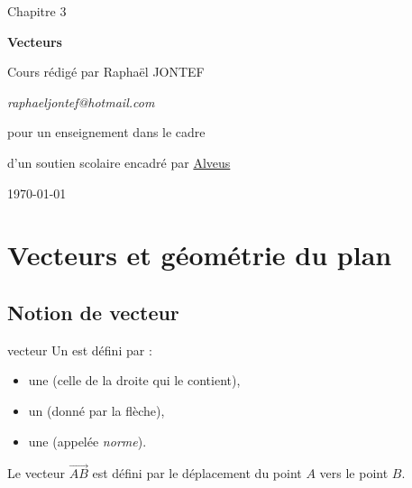 

\newcommand{\titrechapitre}{Vecteurs}
\newcommand{\numerochapitre}{3}

\renewcommand{\headrulewidth}{0.4pt}
\renewcommand{\footrulewidth}{0.4pt}
\fancyfoot[C]{\thepage}
\fancyhead[R]{\titrechapitre}




\setlength{\headheight}{15pt}
\begin{titlepage}
    \centering
    \vspace*{3cm}
    {\huge Chapitre \numerochapitre\par}
    {\Huge \bfseries\titrechapitre\par}
    \vspace{8cm}
    {\Large Cours rédigé par Raphaël JONTEF\par}
    \vspace{2em}
    {\small \textit{raphaeljontef@hotmail.com}\par}
    \vspace{2cm}

    {\normalsize pour un enseignement dans le cadre  \par}
    {\small d'un soutien scolaire encadré par \href{https://www.alveusclub.com/}{Alveus} \par}
    \vfill
    {\large \today\par}
\end{titlepage}

\newpage



\section{Vecteurs et géométrie du plan}

\subsection{Notion de vecteur}

\begin{definition}{}{vecteur}
Un  est défini par :
\begin{itemize}
    \item une  (celle de la droite qui le contient),
    \item un  (donné par la flèche),
    \item une  (appelée \textit{norme}).
\end{itemize}
Le vecteur $\overrightarrow{AB}$ est défini par le déplacement du point $A$ vers le point $B$.
\end{definition}


